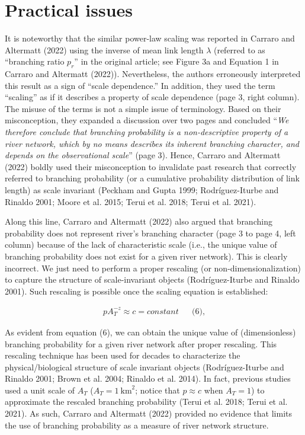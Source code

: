 \documentclass[
  12pt,
]{article}
\begin{document}
\hypertarget{practical-issues}{%
\section{Practical issues}\label{practical-issues}}

It is noteworthy that the similar power-law scaling was reported in Carraro and Altermatt (2022) using the inverse of mean link length \(\lambda\) (referred to as ``branching ratio \(p_r\)'' in the original article; see Figure 3a and Equation 1 in Carraro and Altermatt (2022)). Nevertheless, the authors erroneously interpreted this result as a sign of ``scale dependence.'' In addition, they used the term ``scaling'' as if it describes a property of scale dependence (page 3, right column). The misuse of the terms is not a simple issue of terminology. Based on their misconception, they expanded a discussion over two pages and concluded ``\emph{We therefore conclude that branching probability is a non-descriptive property of a river network, which by no means describes its inherent branching character, and depends on the observational scale}'' (page 3). Hence, Carraro and Altermatt (2022) boldly used their misconception to invalidate past research that correctly referred to branching probability (or a cumulative probability distribution of link length) as scale invariant (Peckham and Gupta 1999; Rodríguez-Iturbe and Rinaldo 2001; Moore et al. 2015; Terui et al. 2018; Terui et al. 2021).

Along this line, Carraro and Altermatt (2022) also argued that branching probability does not represent river's branching character (page 3 to page 4, left column) because of the lack of characteristic scale (i.e., the unique value of branching probability does not exist for a given river network). This is clearly incorrect. We just need to perform a proper rescaling (or non-dimensionalization) to capture the structure of scale-invariant objects (Rodríguez-Iturbe and Rinaldo 2001). Such rescaling is possible once the scaling equation is established:

\[
\begin{aligned}
p A_T^{-z} \approx c = constant &&\text{(6),}
\end{aligned}
\]

As evident from equation (6), we can obtain the unique value of (dimensionless) branching probability for a given river network after proper rescaling. This rescaling technique has been used for decades to characterize the physical/biological structure of scale invariant objects (Rodríguez-Iturbe and Rinaldo 2001; Brown et al. 2004; Rinaldo et al. 2014). In fact, previous studies used a unit scale of \(A_T\) (\(A_T = 1~\text{km}^2\); notice that \(p \approx c\) when \(A_T = 1\)) to approximate the rescaled branching probability (Terui et al. 2018; Terui et al. 2021). As such, Carraro and Altermatt (2022) provided no evidence that limits the use of branching probability as a measure of river network structure.
\end{document}
